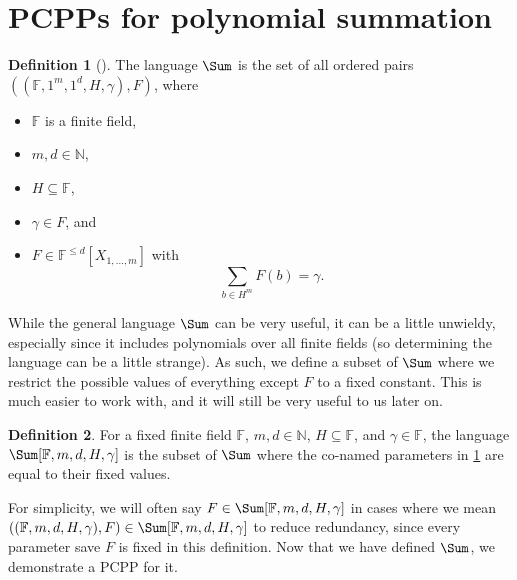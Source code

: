 \documentclass[english,12pt]{reedthesis}
\theoremstyle{plain}
\theoremstyle{definition}
\newtheorem{defn}[defn]{Definition}
\theoremstyle{remark}
\begin{document}
\section{PCPPs for polynomial summation}\label{sec:pcpp-poly-sum}

\begin{defn}[{\cite[Def.\ 4.1]{GOS25}}]\label{def:sum-lang}
  The language $\Sum$ is the set of all ordered pairs
  $((\mathbb{F}, 1^{m}, 1^{d}, H, \gamma), F)$, where
  \begin{itemize}
    \item $\mathbb{F}$ is a finite field,
    \item $m, d \in \mathbb{N}$,
    \item $H \subseteq \mathbb{F}$,
    \item $\gamma \in F$, and
    \item $F \in \mathbb{F}^{\le d}[X_{1, \ldots, m}]$ with
          \[
            \sum_{b \in H^{m}}F(b) = \gamma.
          \]
  \end{itemize}
\end{defn}

While the general language $\Sum$ can be very useful, it can be a little
unwieldy, especially since it includes polynomials over all finite fields (so
determining the language can be a little strange). As such, we define a subset
of $\Sum$ where we restrict the possible values of everything except $F$ to a
fixed constant. This is much easier to work with, and it will still be very
useful to us later on.

\begin{defn}\label{def:sum-params}
  For a fixed finite field $\mathbb{F}$, $m, d \in \mathbb{N}$, $H \subseteq \mathbb{F}$, and
  $\gamma \in \mathbb{F}$, the language $\Sum[\mathbb{F}, m, d, H, \gamma]$ is the subset of
  $\Sum$ where the co-named parameters in \cref{def:sum-lang} are equal to their
  fixed values.
\end{defn}

For simplicity, we will often say $F \in \Sum[\mathbb{F}, m, d, H, \gamma]$ in cases
where we mean $((\mathbb{F}, m, d, H, \gamma), F) \in \Sum[\mathbb{F}, m, d, H, \gamma]$ to
reduce redundancy, since every parameter save $F$ is fixed in this definition.
Now that we have defined $\Sum$, we demonstrate a PCPP for it.
\end{document}
